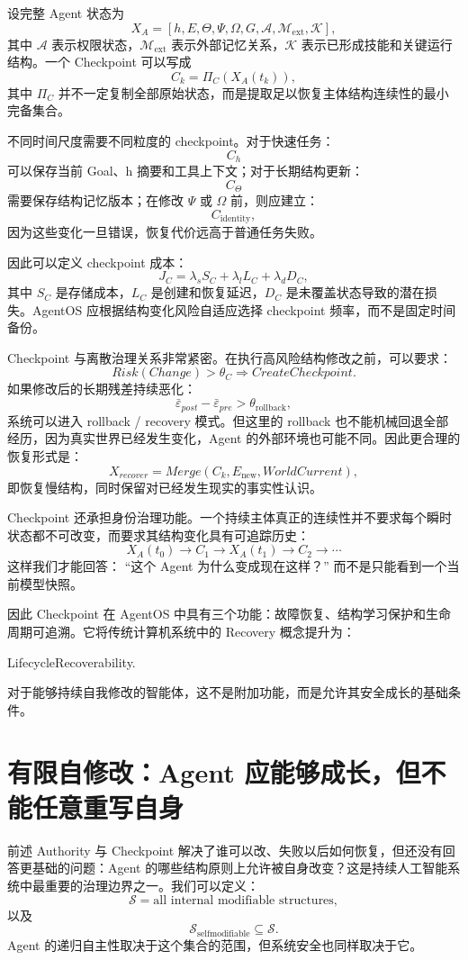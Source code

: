 设完整 Agent 状态为
\[
X_A
=
[
h,E,\Theta,\Psi,\Omega,
G,
\mathcal A,
\mathcal M_{\mathrm{ext}},
\mathcal K
],
\]
其中 $\mathcal A$ 表示权限状态，$\mathcal M_{\mathrm{ext}}$ 表示外部记忆关系，$\mathcal K$ 表示已形成技能和关键运行结构。一个 Checkpoint 可以写成
\[
C_k
=
\Pi_C(X_A(t_k)),
\]
其中 $\Pi_C$ 并不一定复制全部原始状态，而是提取足以恢复主体结构连续性的最小完备集合。

不同时间尺度需要不同粒度的 checkpoint。对于快速任务：
\[
C_h
\]
可以保存当前 Goal、h 摘要和工具上下文；对于长期结构更新：
\[
C_\Theta
\]
需要保存结构记忆版本；在修改 $\Psi$ 或 $\Omega$ 前，则应建立：
\[
C_{\mathrm{identity}},
\]
因为这些变化一旦错误，恢复代价远高于普通任务失败。

因此可以定义 checkpoint 成本：
\[
J_C
=
\lambda_s S_C
+
\lambda_l L_C
+
\lambda_d D_C,
\]
其中 $S_C$ 是存储成本，$L_C$ 是创建和恢复延迟，$D_C$ 是未覆盖状态导致的潜在损失。AgentOS 应根据结构变化风险自适应选择 checkpoint 频率，而不是固定时间备份。

Checkpoint 与离散治理关系非常紧密。在执行高风险结构修改之前，可以要求：
\[
Risk(Change)>\theta_C
\Rightarrow
CreateCheckpoint.
\]
如果修改后的长期残差持续恶化：
\[
\bar{\varepsilon}_{post}
-
\bar{\varepsilon}_{pre}
>
\theta_{\mathrm{rollback}},
\]
系统可以进入 rollback / recovery 模式。但这里的 rollback 也不能机械回退全部经历，因为真实世界已经发生变化，Agent 的外部环境也可能不同。因此更合理的恢复形式是：
\[
X_{recover}
=
Merge
\left(
C_k,
E_{\mathrm{new}},
WorldCurrent
\right),
\]
即恢复慢结构，同时保留对已经发生现实的事实性认识。

Checkpoint 还承担身份治理功能。一个持续主体真正的连续性并不要求每个瞬时状态都不可改变，而要求其结构变化具有可追踪历史：
\[
X_A(t_0)
\rightarrow
C_1
\rightarrow
X_A(t_1)
\rightarrow
C_2
\rightarrow\cdots
\]
这样我们才能回答：
``这个 Agent 为什么变成现在这样？''
而不是只能看到一个当前模型快照。

因此 Checkpoint 在 AgentOS 中具有三个功能：故障恢复、结构学习保护和生命周期可追溯。它将传统计算机系统中的 Recovery 概念提升为：
\begin{statementbox}
LifecycleRecoverability.
\end{statementbox}
对于能够持续自我修改的智能体，这不是附加功能，而是允许其安全成长的基础条件。

\section{有限自修改：Agent 应能够成长，但不能任意重写自身}

前述 Authority 与 Checkpoint 解决了谁可以改、失败以后如何恢复，但还没有回答更基础的问题：Agent 的哪些结构原则上允许被自身改变？这是持续人工智能系统中最重要的治理边界之一。我们可以定义：
\[
\mathcal S
=
\text{all internal modifiable structures},
\]
以及
\[
\boxed{
\mathcal S_{\mathrm{selfmodifiable}}
\subseteq
\mathcal S.
}
\]
Agent 的递归自主性取决于这个集合的范围，但系统安全也同样取决于它。

